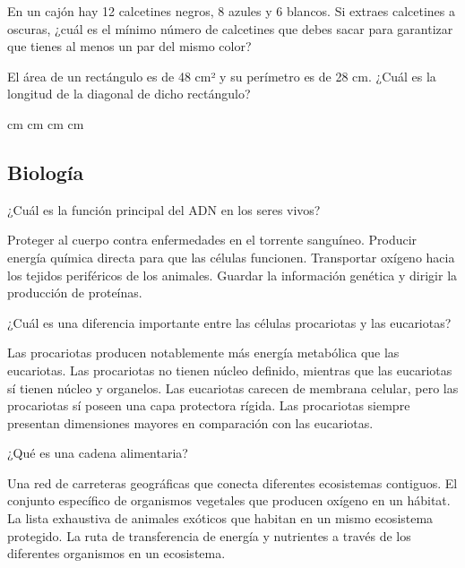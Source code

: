 \documentclass[12pt]{evaluasep}
\begin{document}
\begin{questions}
    \question En un cajón hay 12 calcetines negros, 8 azules y 6 blancos. Si extraes calcetines a oscuras, ¿cuál es el mínimo número de calcetines que debes sacar para garantizar que tienes al menos un par del mismo color?
    \begin{choices}
    \end{choices}
	

    \question El área de un rectángulo es de 48 cm² y su perímetro es de 28 cm. ¿Cuál es la longitud de la diagonal de dicho rectángulo?
    \begin{choices}
         cm
         cm
         cm
         cm
    \end{choices}
	

\subsection{Biología}

\question ¿Cuál es la función principal del ADN en los seres vivos?
  
\begin{choices}
        \choice Proteger al cuerpo contra enfermedades en el torrente sanguíneo.
        \choice Producir energía química directa para que las células funcionen.
        \choice Transportar oxígeno hacia los tejidos periféricos de los animales.
        \CorrectChoice Guardar la información genética y dirigir la producción de proteínas.
    \end{choices}
    

    \newpage

    \question ¿Cuál es una diferencia importante entre las células procariotas y las eucariotas?
  
    \begin{choices}
        \choice Las procariotas producen notablemente más energía metabólica que las eucariotas.
        \CorrectChoice Las procariotas no tienen núcleo definido, mientras que las eucariotas sí tienen núcleo y organelos.
        \choice Las eucariotas carecen de membrana celular, pero las procariotas sí poseen una capa protectora rígida.
        \choice Las procariotas siempre presentan dimensiones mayores en comparación con las eucariotas.
    \end{choices}
    

    \question ¿Qué es una cadena alimentaria?
 
    \begin{choices}
        \choice Una red de carreteras geográficas que conecta diferentes ecosistemas contiguos.
        \choice El conjunto específico de organismos vegetales que producen oxígeno en un hábitat.
        \choice La lista exhaustiva de animales exóticos que habitan en un mismo ecosistema protegido.
        \CorrectChoice La ruta de transferencia de energía y nutrientes a través de los diferentes organismos en un ecosistema.
    \end{choices}
    


\end{questions}
\end{document}
